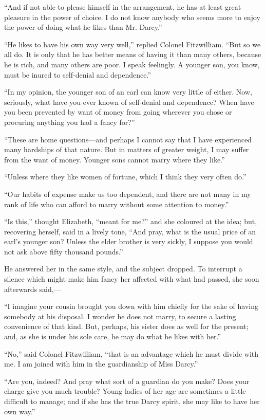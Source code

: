 \documentclass[12pt]{book}
\begin{document}
``And if not able to please himself in the arrangement, he has at least great pleasure in the power of choice. I do not know anybody who seems more to enjoy the power of doing what he likes than Mr. Darcy.''

``He likes to have his own way very well,'' replied Colonel Fitzwilliam. ``But so we all do. It is only that he has better means of having it than many others, because he is rich, and many others are poor. I speak feelingly. A younger son, you know, must be inured to self-denial and dependence.''

``In my opinion, the younger son of an earl can know very little of either. Now, seriously, what have you ever known of self-denial and dependence? When have you been prevented by want of money from going wherever you chose or procuring anything you had a fancy for?''

``These are home questions---and perhaps I cannot say that I have experienced many hardships of that nature. But in matters of greater weight, I may suffer from the want of money. Younger sons cannot marry where they like.''

``Unless where they like women of fortune, which I think they very often do.''

``Our habits of expense make us too dependent, and there are not many in my rank of life who can afford to marry without some attention to money.''

``Is this,'' thought Elizabeth, ``meant for me?'' and she coloured at the idea; but, recovering herself, said in a lively tone, ``And pray, what is the usual price of an earl's younger son? Unless the elder brother is very sickly, I suppose you would not ask above fifty thousand pounds.''

He answered her in the same style, and the subject dropped. To interrupt a silence which might make him fancy her affected with what had passed, she soon afterwards said,---

``I imagine your cousin brought you down with him chiefly for the sake of having somebody at his disposal. I wonder he does not marry, to secure a lasting convenience of that kind. But, perhaps, his sister does as well for the present; and, as she is under his sole care, he may do what he likes with her.''

``No,'' said Colonel Fitzwilliam, ``that is an advantage which he must divide with me. I am joined with him in the guardianship of Miss Darcy.''

``Are you, indeed? And pray what sort of a guardian do you make? Does your charge give you much trouble? Young ladies of her age are sometimes a little difficult to manage; and if she has the true Darcy spirit, she may like to have her own way.''
\end{document}
